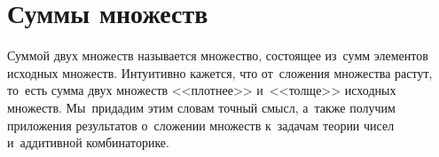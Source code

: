 
\section*{Суммы множеств}



Суммой двух множеств называется множество, состоящее из~сумм элементов исходных
множеств.
Интуитивно кажется, что от~сложения множества растут, то~есть сумма двух
множеств <<плотнее>> и~<<толще>> исходных множеств.
Мы~придадим этим словам точный смысл, а~также получим приложения результатов
о~сложении множеств к~задачам теории чисел и~аддитивной комбинаторике.

